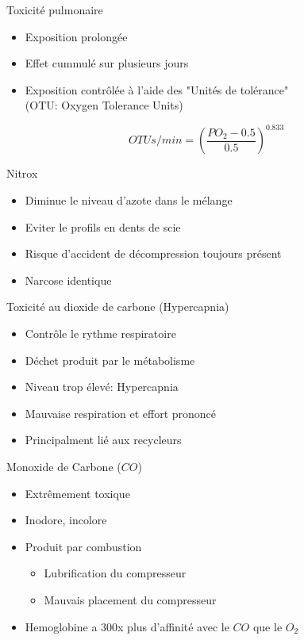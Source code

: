 \begin{frame}{Toxicité pulmonaire}  
	\begin{itemize}
		\item Exposition prolongée
		\item Effet cummulé sur plusieurs jours
		\item Exposition contrôlée à l'aide des "Unités  de tolérance"\\(OTU: Oxygen Tolerance Units)
	\end{itemize}
	$$\boxed{OTUs/min=\left( \dfrac{PO_2-0.5}{0.5} \right)^{0.833}}$$
\end{frame}

\begin{frame}{Nitrox}  
	\begin{itemize}
		\item Diminue le niveau d'azote dans le mélange
		\item Eviter le profils en dents de scie
		\item Risque d'accident de décompression toujours présent
		\item Narcose identique
	\end{itemize}
\end{frame}

\begin{frame}{Toxicité au dioxide de carbone (Hypercapnia)}  
	\begin{itemize}
		\item Contrôle le rythme respiratoire
		\item Déchet produit par le métabolisme
		\item Niveau trop élevé: Hypercapnia
		\item Mauvaise respiration et effort prononcé
		\item Principalment lié aux recycleurs
	\end{itemize}
\end{frame}

\begin{frame}{Monoxide de Carbone ($CO$)}
	\begin{itemize}
		\item Extrêmement toxique
		\item Inodore, incolore
		\item Produit par combustion
		\begin{itemize}
			\item Lubrification du compresseur
			\item Mauvais placement du compresseur
		\end{itemize}
		\item Hemoglobine a 300x plus d'affinité avec le $CO$ que le $O_2$
	\end{itemize}
\end{frame}